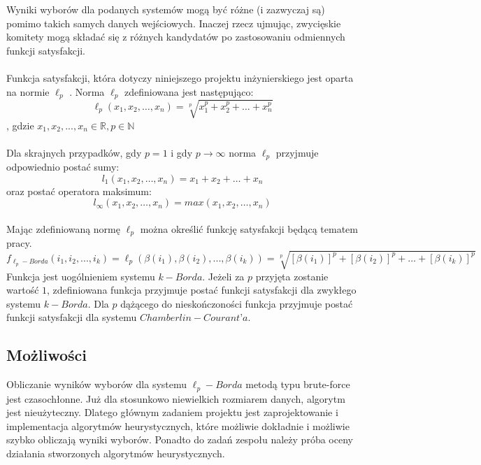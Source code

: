 \documentclass[polish,11pt]{aghthesis}
\begin{document}
Wyniki wyborów dla podanych systemów mogą być różne (i zazwyczaj są) pomimo takich
samych danych wejściowych. Inaczej rzecz ujmując, zwycięskie komitety mogą składać się z
różnych kandydatów po zastosowaniu odmiennych funkcji satysfakcji. \\ \\
Funkcja satysfakcji, która dotyczy niniejszego projektu inżynierskiego jest oparta na normie
$\ell_p$ . Norma $\ell_p$ zdefiniowana jest następująco:
$$\ell_p(x_1,x_2,\dots, x_n) = \sqrt[p]{x_1^p+x_2^p+\dots+x_n^p}$$
, gdzie $x_1, x_2, ..., x_n \in \mathbb{R}, p \in \mathbb{N}$ \\ \\
Dla skrajnych przypadków, gdy $p = 1$ i gdy $p \to \infty$ norma $\ell_p$ przyjmuje odpowiednio postać sumy: $$l_1(x_1, x_2,\dots, x_n) = x_1 + x_2 +\dots+ x_n$$ oraz postać operatora maksimum: $$l_\infty(x_1, x_2,\dots, x_n) = max(x_1, x_2,\dots, x_n)$$
\\ Mając zdefiniowaną normę $\ell_p$ można określić funkcję satysfakcji będącą tematem pracy. $$f_{{\ell_p}-Borda}(i_1, i_2, ..., i_k) = \ell_p(\beta(i_1), \beta(i_2), ..., \beta(i_k)) = \sqrt[p]{[\beta(i_1)]^p+[\beta(i_2)]^p+\dots+[\beta(i_k)]^p}$$
\clearpage
Funkcja jest uogólnieniem systemu $k-Borda$. Jeżeli za $p$ przyjęta zostanie wartość $1$,
zdefiniowana funkcja przyjmuje postać funkcji satysfakcji dla zwykłego systemu $k-Borda$. Dla $p$ dążącego do nieskończoności funkcja przyjmuje postać funkcji satysfakcji dla systemu
$Chamberlin-Courant’a$.


\subsection{Możliwości}
Obliczanie wyników wyborów dla systemu $\ell_p-Borda$ metodą typu brute-force jest
czasochłonne. Już dla stosunkowo niewielkich rozmiarem danych, algorytm jest nieużyteczny. Dlatego głównym zadaniem projektu jest zaprojektowanie i implementacja algorytmów heurystycznych, które możliwie dokładnie i możliwie szybko obliczają wyniki wyborów. Ponadto do zadań zespołu należy próba oceny działania stworzonych algorytmów heurystycznych.

\end{document}
